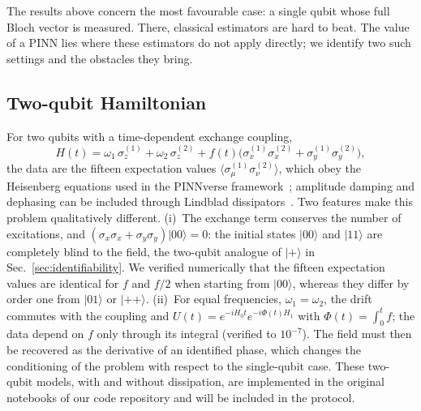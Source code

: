 \documentclass[aps,pra,twocolumn,superscriptaddress,10pt,longbibliography,floatfix]{revtex4-2}
\begin{document}
The results above concern the most favourable case: a single qubit whose full Bloch vector is measured.
There, classical estimators are hard to beat. The value of a PINN lies where these estimators do not
apply directly; we identify two such settings and the obstacles they bring.

\subsection{Two-qubit Hamiltonian}\label{sec:twoqubits}
For two qubits with a time-dependent exchange coupling,
\begin{equation}
  H(t) = \omega_1\,\sigma_z^{(1)} + \omega_2\,\sigma_z^{(2)}
        + f(t)\big(\sigma_x^{(1)}\sigma_x^{(2)} + \sigma_y^{(1)}\sigma_y^{(2)}\big),
  \label{eq:H2}
\end{equation}
the data are the fifteen expectation values $\langle\sigma_\mu^{(1)}\sigma_\nu^{(2)}\rangle$, which
obey the Heisenberg equations used in the PINNverse
framework~\cite{castelano2024freezing,delima2025pinnverse}; amplitude damping and dephasing can be
included through Lindblad dissipators~\cite{lindblad1976,gorini1976}. Two features make this problem
qualitatively different. (i)~The exchange term conserves the number of excitations, and
$(\sigma_x\sigma_x+\sigma_y\sigma_y)|00\rangle=0$: the initial states $|00\rangle$ and $|11\rangle$ are
completely blind to the field, the two-qubit analogue of $|+\rangle$ in
Sec.~\ref{sec:identifiability}. We verified numerically that the fifteen expectation values are
identical for $f$ and $f/2$ when starting from $|00\rangle$, whereas they differ by order one from
$|01\rangle$ or $|{+}{+}\rangle$. (ii)~For equal frequencies, $\omega_1=\omega_2$, the drift commutes
with the coupling and $U(t)=e^{-iH_0t}e^{-i\Phi(t)H_1}$ with $\Phi(t)=\int_0^tf$; the data depend on $f$
only through its integral (verified to $10^{-7}$). The field must then be recovered as the derivative of
an identified phase, which changes the conditioning of the problem with respect to the single-qubit
case. These two-qubit models, with and without dissipation, are implemented in the original notebooks
of our code repository and will be included in the protocol.
\end{document}
